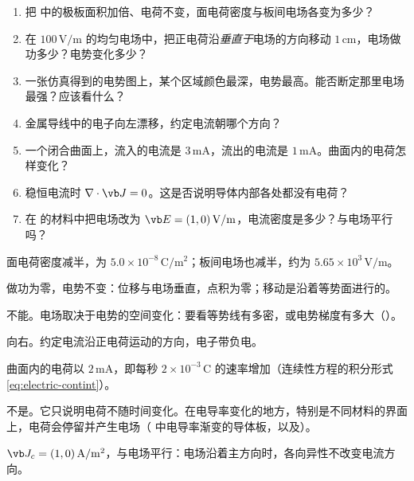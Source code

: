 \begin{selfcheck}
\begin{enumerate}
\item 把 中的极板面积加倍、电荷不变，面电荷密度与板间电场各变为多少？
\item 在 $100\,\mathrm{V/m}$ 的均匀电场中，把正电荷沿\emph{垂直于}电场的方向移动 $1\,\mathrm{cm}$，电场做功多少？电势变化多少？
\item 一张仿真得到的电势图上，某个区域颜色最深，电势最高。能否断定那里电场最强？应该看什么？
\item 金属导线中的电子向左漂移，约定电流朝哪个方向？
\item 一个闭合曲面上，流入的电流是 $3\,\mathrm{mA}$，流出的电流是 $1\,\mathrm{mA}$。曲面内的电荷怎样变化？
\item 稳恒电流时 $\nabla\cdot\vb J=0$。这是否说明导体内部各处都没有电荷？
\item 在 的材料中把电场改为 $\vb E=(1,0)\,\mathrm{V/m}$，电流密度是多少？与电场平行吗？
\end{enumerate}
\end{selfcheck}

\begin{answers}
\item 面电荷密度减半，为 $5.0\times10^{-8}\,\mathrm{C/m^2}$；板间电场也减半，约为 $5.65\times10^3\,\mathrm{V/m}$。
\item 做功为零，电势不变：位移与电场垂直，点积为零；移动是沿着等势面进行的。
\item 不能。电场取决于电势的空间变化：要看等势线有多密，或电势梯度有多大（）。
\item 向右。约定电流沿正电荷运动的方向，电子带负电。
\item 曲面内的电荷以 $2\,\mathrm{mA}$，即每秒 $2\times10^{-3}\,\mathrm C$ 的速率增加（连续性方程的积分形式 \eqref{eq:electric-contint}）。
\item 不是。它只说明电荷不随时间变化。在电导率变化的地方，特别是不同材料的界面上，电荷会停留并产生电场（ 中电导率渐变的导体板，以及）。
\item $\vb J_c=(1,0)\,\mathrm{A/m^2}$，与电场平行：电场沿着主方向时，各向异性不改变电流方向。
\end{answers}
